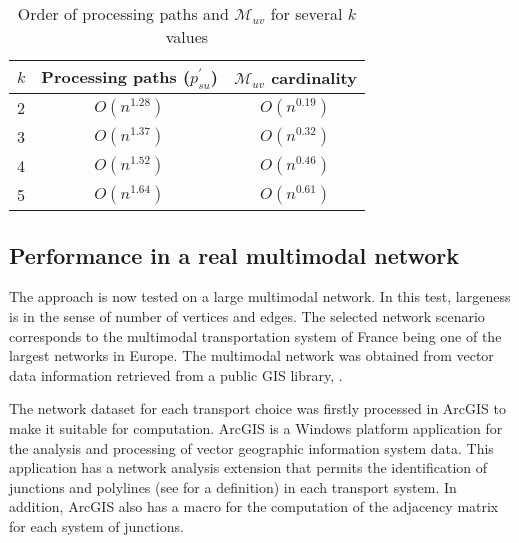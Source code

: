 \documentclass[preprint,authoryear,12pt]{elsarticle}
\begin{document}
\begin{table}
\caption{Order of processing paths and $\mathcal{M}_{uv}$
\@cardinality for several $k$ values}\label{orders1}
\vspace{-0.08in}
\begin{center}
\begin{tabular}{lcc}\hline
  $k$ & \hspace{1.0cm}Processing paths ($p^\prime_{su}$)&\hspace{1.0cm}$\mathcal{M}_{uv}$ cardinality \\ \hline
  2   & $O(n^{1.28})$ & $O(n^{0.19})$\\
  3   & $O(n^{1.37})$ & $O(n^{0.32})$\\
  4   & $O(n^{1.52})$ & $O(n^{0.46})$\\
  5   & $O(n^{1.64})$ & $O(n^{0.61})$\\ \hline
\end{tabular}
\end{center}
\end{table}



\subsection{Performance in a real multimodal network}

The approach is now tested on a large multimodal network. In this test,
largeness is in the sense of number of vertices and edges. The selected network scenario
corresponds to the multimodal transportation system of France being one of the
largest networks in Europe. The multimodal network was obtained from vector data
information retrieved from a public GIS library, \cite{cloud2010}.

The network dataset for each transport choice was firstly processed
in ArcGIS to make it suitable for computation. ArcGIS is a Windows
platform application for the analysis and processing of
vector geographic information system data. This application has a network analysis
extension that permits the identification of junctions and polylines
(see \cite{Burke2002} for a definition) in each transport system. In
addition, ArcGIS also has a macro for the computation
of the adjacency matrix for each system of junctions.
\end{document}
